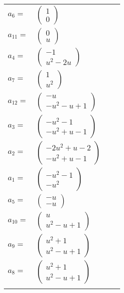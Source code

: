 \documentclass[1p]{elsarticle_modified}
\theoremstyle{definition}
\begin{document}
\begin{tabular}{m{7pt} m{180pt} m{7pt} m{180pt} }
\flushright $a_{6}=$&$\begin{pmatrix}1\\0\end{pmatrix}$ \\
\flushright $a_{11}=$&$\begin{pmatrix}0\\u\end{pmatrix}$ \\
\flushright $a_{4}=$&$\begin{pmatrix}-1\\u^2-2 u\end{pmatrix}$ \\
\flushright $a_{7}=$&$\begin{pmatrix}1\\u^2\end{pmatrix}$ \\
\flushright $a_{12}=$&$\begin{pmatrix}- u\\- u^2- u+1\end{pmatrix}$ \\
\flushright $a_{3}=$&$\begin{pmatrix}- u^2-1\\- u^2+u-1\end{pmatrix}$ \\
\flushright $a_{2}=$&$\begin{pmatrix}-2 u^2+u-2\\- u^2+u-1\end{pmatrix}$ \\
\flushright $a_{1}=$&$\begin{pmatrix}- u^2-1\\- u^2\end{pmatrix}$ \\
\flushright $a_{5}=$&$\begin{pmatrix}- u\\- u\end{pmatrix}$ \\
\flushright $a_{10}=$&$\begin{pmatrix}u\\u^2- u+1\end{pmatrix}$ \\
\flushright $a_{9}=$&$\begin{pmatrix}u^2+1\\u^2- u+1\end{pmatrix}$ \\
\flushright $a_{8}=$&$\begin{pmatrix}u^2+1\\u^2- u+1\end{pmatrix}$\\&\end{tabular}
\end{document}
